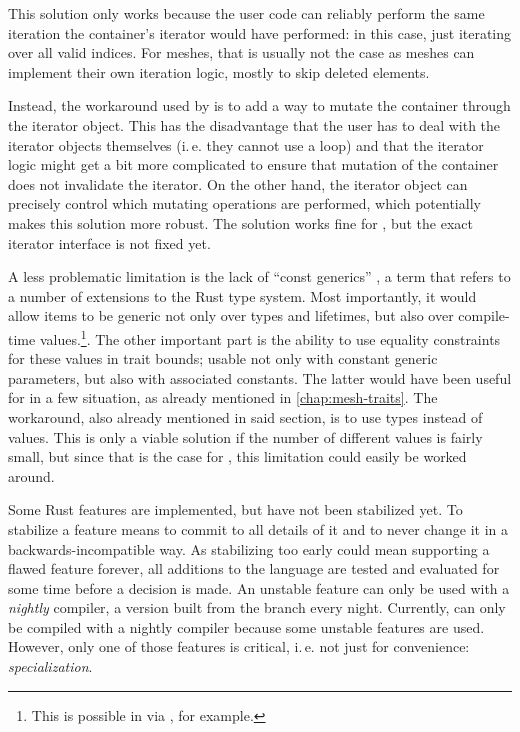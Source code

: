 This solution only works because the user code can reliably perform the same iteration the container's iterator would have performed: in this case, just iterating over all valid indices.
For meshes, that is usually not the case as meshes can implement their own iteration logic, mostly to skip deleted elements.

Instead, the workaround used by  is to add a way to mutate the container through the iterator object.
This has the disadvantage that the user has to deal with the iterator objects themselves (i.\,e. they cannot use a  loop) and that the iterator logic might get a bit more complicated to ensure that mutation of the container does not invalidate the iterator.
On the other hand, the iterator object can precisely control which mutating operations are performed, which potentially makes this solution more robust.
The solution works fine for , but the exact iterator interface is not fixed yet.

\newpage

A less problematic limitation is the lack of \enquote{const generics} \cite{rfc2000}, a term that refers to a number of extensions to the Rust type system.
Most importantly, it would allow items to be generic not only over types and lifetimes, but also over compile-time values.\footnote{This is possible in \cpp via , for example.}.
The other important part is the ability to use equality constraints for these values in trait bounds; usable not only with constant generic parameters, but also with associated constants.
The latter would have been useful for  in a few situation, as already mentioned in \autoref{chap:mesh-traits}.
The workaround, also already mentioned in said section, is to use types instead of values.
This is only a viable solution if the number of different values is fairly small, but since that is the case for , this limitation could easily be worked around.

Some Rust features are implemented, but have not been stabilized yet.
To stabilize a feature means to commit to all details of it and to never change it in a backwards-incompatible way.
As stabilizing too early could mean supporting a flawed feature forever, all additions to the language are tested and evaluated for some time before a decision is made.
An unstable feature can only be used with a \emph{nightly} compiler, a version built from the  branch every night.
Currently,  can only be compiled with a nightly compiler because some unstable features are used.
However, only one of those features is critical, i.\,e. not just for convenience: \emph{specialization}.

